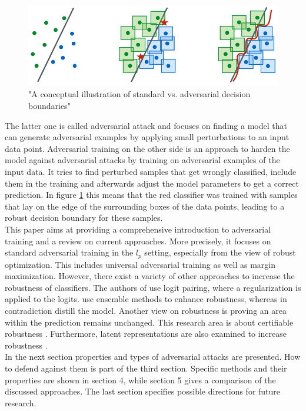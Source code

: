 \documentclass{article}
\begin{document}
\begin{figure}[ht]
  \centering
  \vspace{-0.6cm}
  \includegraphics[scale=0.27]{decision_boundaries.png}
  \vspace{-0.45cm}
  \caption{"A conceptual illustration of standard vs. adversarial decision boundaries" \cite{b2}} 
  \label{fig2: standard and adversarial decision boundaries}
  \vspace{-0.2cm}
\end{figure}
\vspace{-0.07cm}
The latter one is called adversarial attack and focuses on finding a model that can generate adversarial examples by applying small perturbations to an input data point. Adversarial training on the other side is an approach to harden the model against adversarial attacks by training on adversarial examples of the input data. It tries to find perturbed samples that get wrongly classified, include them in the training and afterwards adjust the model parameters to get a correct prediction. In figure \ref{fig2: standard and adversarial decision boundaries} this means that the red classifier was trained with samples that lay on the edge of the surrounding boxes of the data points, leading to a robust decision boundary for these samples. \\
This paper aims at providing a comprehensive introduction to adversarial training and a review on current approaches. More precisely, it focuses on standard adversarial training in the $l_p$ setting, especially from the view of robust optimization. This includes universal adversarial training as well as margin maximization. However, there exist a variety of other approaches to increase the robustness of classifiers. The authors of \cite{b19, b20} use logit pairing, where a regularization is applied to the logits. \cite{b23} use ensemble methods to enhance robustness, whereas \cite{b21, b22} in contradiction distill the model. Another view on robustness is proving an area within the prediction remains unchanged. This research area is about certifiable robustness \cite{b30}. Furthermore, latent representations are also examined to increase robustness \cite{b31}. \\
In the next section properties and types of adversarial attacks are presented. How to defend against them is part of the third section. Specific methods and their properties are shown in section 4, while section 5 gives a comparison of the discussed approaches. The last section specifies possible directions for future research.
\end{document}
